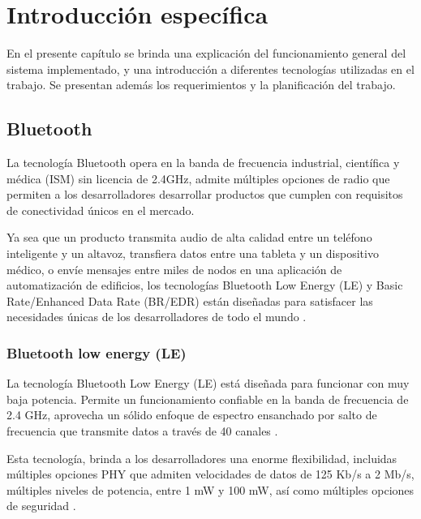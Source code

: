 \chapter{Introducción específica} %

\label{Chapter2}

En el presente capítulo se brinda una explicación del funcionamiento general del sistema implementado, y una introducción a diferentes tecnologías utilizadas en el trabajo. Se presentan además los requerimientos y la planificación del trabajo.

\section{Bluetooth}

La tecnología Bluetooth opera en la banda de frecuencia industrial, científica y médica (ISM) sin licencia de 2.4GHz, admite múltiples opciones de radio que permiten a los desarrolladores desarrollar productos que cumplen con requisitos de conectividad únicos en el mercado. 

Ya sea que un producto transmita audio de alta calidad entre un teléfono inteligente y un altavoz, transfiera datos entre una tableta y un dispositivo médico, o envíe mensajes entre miles de nodos en una aplicación de automatización de edificios, los tecnologías Bluetooth Low Energy (LE) y Basic Rate/Enhanced Data Rate (BR/EDR) están diseñadas para satisfacer las necesidades únicas de los desarrolladores de todo el mundo \cite{bluetooth}.


\subsection{Bluetooth low energy (LE)}

La tecnología Bluetooth Low Energy (LE) está diseñada para funcionar con muy baja potencia. Permite un funcionamiento confiable en la banda de frecuencia de 2.4 GHz, aprovecha un sólido enfoque de espectro ensanchado por salto de frecuencia que transmite datos a través de 40 canales \cite{bluetooth}.

Esta tecnología, brinda a los desarrolladores una enorme flexibilidad, incluidas múltiples opciones PHY que admiten velocidades de datos de 125 Kb/s a 2 Mb/s, múltiples niveles de potencia, entre 1 mW y 100 mW, así como múltiples opciones de seguridad \cite{bluetooth}. 

